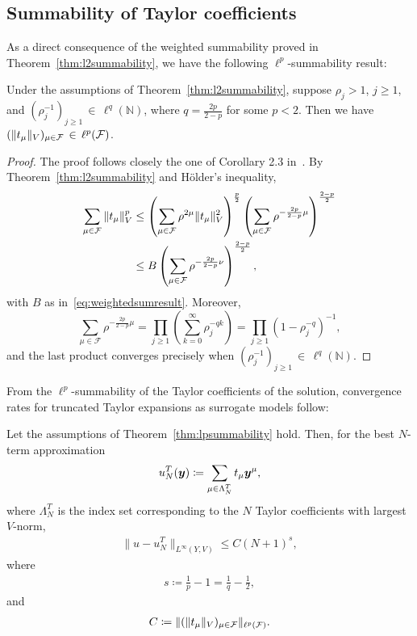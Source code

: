 \subsection{Summability of Taylor coefficients}
As a direct consequence of the weighted summability proved in Theorem~\ref{thm:l2summability}, we have the following $\ell^p$-summability result:
\label{sec:ellpsum}
\begin{theorem}
	\label{thm:lpsummability}
	Under the assumptions of Theorem~\ref{thm:l2summability}, suppose $\rho_j > 1$, $j\geq 1$, and $(\rho_j^{-1})_{j\geq 1} \, \in  \, \ell^q(\mathbb{N})$, where $q = \frac{2p}{2-p}$ for some $p < 2$.
	Then we have $(\|t_\mu\|_{{V}})_{\mu \in \mathcal{F}} \, \in \, \ell^p(\mathcal{F})$.
\end{theorem}
\begin{proof}
	The proof follows closely the one of Corollary 2.3 in~\cite{bachmayr2017a}.
	By Theorem~\ref{thm:l2summability} and Hölder's inequality,
	\begin{align*}
		\sum_{\mu \in \mathcal{F}} \|t_\mu\|_{{V}}^p &\leq \left( \sum_{\mu \in \mathcal{F}} \rho^{2\mu} \|t_\mu\|_{{V}}^2 \right)^{\frac{p}{2}} \left( \sum_{\mu \in \mathcal{F}} \rho^{-\frac{2p}{2-p}\mu} \right)^{\frac{2-p}{2}}\\
		&\leq B \left( \sum_{\mu \in \mathcal{F}} \rho^{-\frac{2p}{2-p}\nu} \right)^{\frac{2-p}{2}},
	\end{align*}
	with $B$ as in~\eqref{eq:weightedsumresult}.
	Moreover,
	\begin{equation*}
		\sum_{\mu \in \mathcal{F}} \rho^{-\frac{2p}{2-p}\mu} = \prod_{j \geq 1}\left( \sum_{k=0}^\infty \rho_j^{-qk}  \right)= \prod_{j \geq 1}\left( 1-\rho_j^{-q} \right)^{-1},
	\end{equation*}
	and the last product converges precisely when $(\rho_j^{-1})_{j\geq 1} \, \in  \, \ell^q(\mathbb{N})$.
\end{proof}
From the $\ell^p$-summability of the Taylor coefficients of the solution, convergence rates for truncated Taylor expansions as surrogate models follow:
\begin{corollary}\label{cor:stechkin}
Let the assumptions of Theorem~\ref{thm:lpsummability} hold.
Then, for the best $N$-term approximation
\begin{align*}
	u_N^T({\bm{y}}) \coloneqq \sum_{\mu \in \Lambda_N^T} t_\mu {\bm{y}}^\mu,
\end{align*}
where $\Lambda_N^T$ is the index set corresponding to the $N$ Taylor coefficients with largest $V$-norm, 
\begin{align*}
	\|u-u_N^T\|_{L^\infty(Y,V)} \leq C (N+1)^s,
\end{align*}
where
\begin{align*}
	s\coloneqq\frac{1}{p} - 1 = \frac{1}{q} - \frac{1}{2},
\end{align*}
and
\begin{align*}
	C\coloneqq \|(\|t_\mu\|_{{V}})_{\mu \in \mathcal{F}}\|_{\ell^p(\mathcal{F})}.
\end{align*}
\end{corollary}
